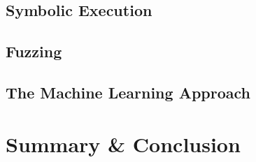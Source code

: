 \documentclass[a4paper,11pt]{article}
\begin{document}
\subsection{Symbolic Execution}

\subsection{Fuzzing}

\subsection{The Machine Learning Approach}

\section{Summary \& Conclusion}

\nocite{*}



\small

\end{document}
